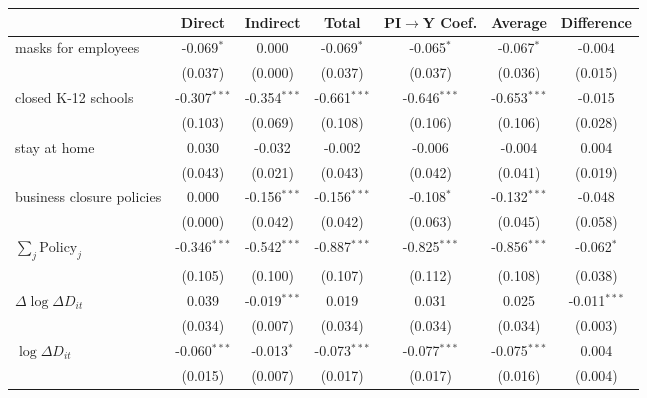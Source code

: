 
\begin{tabular}{lccccc|>{}c}
\toprule
  & Direct & Indirect & Total & PI$\to$Y Coef. & Average & Difference\\
\midrule
masks for employees & -0.069$^{*}$ & 0.000 & -0.069$^{*}$ & -0.065$^{*}$ & -0.067$^{*}$ & -0.004\\
 & (0.037) & (0.000) & (0.037) & (0.037) & (0.036) & (0.015)\\
closed K-12 schools & -0.307$^{***}$ & -0.354$^{***}$ & -0.661$^{***}$ & -0.646$^{***}$ & -0.653$^{***}$ & -0.015\\
 & (0.103) & (0.069) & (0.108) & (0.106) & (0.106) & (0.028)\\
stay at home & 0.030 & -0.032 & -0.002 & -0.006 & -0.004 & 0.004\\
 & (0.043) & (0.021) & (0.043) & (0.042) & (0.041) & (0.019)\\
business closure policies & 0.000 & -0.156$^{***}$ & -0.156$^{***}$ & -0.108$^{*}$ & -0.132$^{***}$ & -0.048\\
 & (0.000) & (0.042) & (0.042) & (0.063) & (0.045) & (0.058)\\
$\sum_j \mathrm{Policy}_j$ & -0.346$^{***}$ & -0.542$^{***}$ & -0.887$^{***}$ & -0.825$^{***}$ & -0.856$^{***}$ & -0.062$^{*}$\\
 & (0.105) & (0.100) & (0.107) & (0.112) & (0.108) & (0.038)\\
$\Delta \log \Delta D_{it}$ & 0.039 & -0.019$^{***}$ & 0.019 & 0.031 & 0.025 & -0.011$^{***}$\\
 & (0.034) & (0.007) & (0.034) & (0.034) & (0.034) & (0.003)\\
$\log \Delta D_{it}$ & -0.060$^{***}$ & -0.013$^{*}$ & -0.073$^{***}$ & -0.077$^{***}$ & -0.075$^{***}$ & 0.004\\
 & (0.015) & (0.007) & (0.017) & (0.017) & (0.016) & (0.004)\\
\bottomrule
\end{tabular}